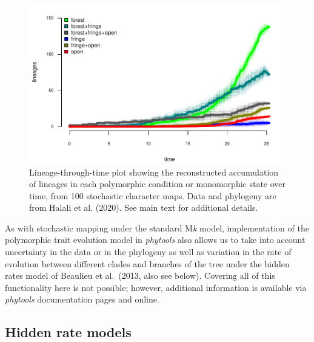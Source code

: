 \documentclass[fleqn,10pt,lineno]{wlpeerj} %
\begin{document}
\begin{figure}
\includegraphics[width=1\linewidth]{Revell.phytools-v2_peerj_files/figure-latex/ltt-fitpolyMk-1} \caption{Lineage-through-time plot showing the reconstructed accumulation of lineages in each polymorphic condition or monomorphic state over time, from 100 stochastic character maps. Data and phylogeny are from Halali et al. (2020). See main text for additional details.}\label{fig:ltt-fitpolyMk}
\end{figure}

As with stochastic mapping under the standard M\emph{k} model, implementation of the polymorphic trait evolution model in \emph{phytools} also allows us to take into account uncertainty in the data or in the phylogeny as well as variation in the rate of evolution between different clades and branches of the tree under the hidden rates model of Beaulieu et al.~(2013, also see below). Covering all of this functionality here is not possible; however, additional information is available via \emph{phytools} documentation pages and online.

\hypertarget{hidden-rate-models}{%
\subsection{Hidden rate models}\label{hidden-rate-models}}
\end{document}

